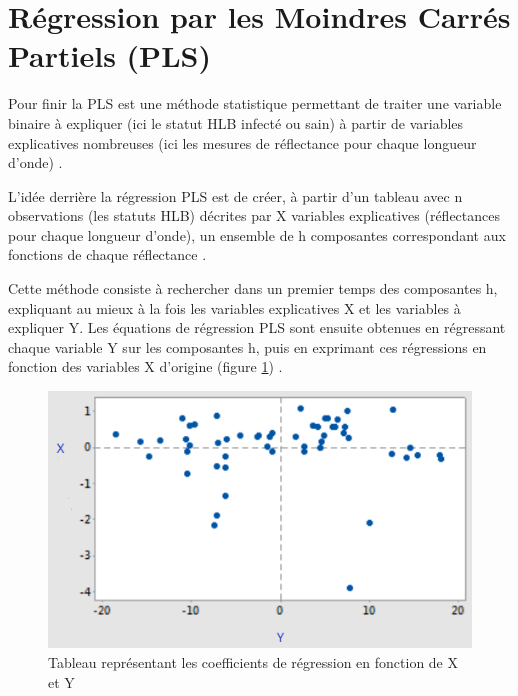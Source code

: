 \documentclass[
  11pt,
  french,
  a4paper,
  extrafontsizes,onecolumn,openright
  ]{memoir}
\begin{document}
\vfill
\newpage

\hypertarget{ruxe9gression-par-les-moindres-carruxe9s-partiels-pls}{%
\section{Régression par les Moindres Carrés Partiels (PLS)}\label{ruxe9gression-par-les-moindres-carruxe9s-partiels-pls}}

Pour finir la PLS est une méthode statistique permettant de traiter une variable binaire à expliquer (ici le statut HLB infecté ou sain) à partir de variables explicatives nombreuses (ici les mesures de réflectance pour chaque longueur d'onde) \autocite{pls}.

L'idée derrière la régression PLS est de créer, à partir d'un tableau avec n observations (les statuts HLB) décrites par X variables explicatives (réflectances pour chaque longueur d'onde), un ensemble de h composantes correspondant aux fonctions de chaque réflectance \autocite{tenehaus_lapproche_1999}.

Cette méthode consiste à rechercher dans un premier temps des composantes h, expliquant au mieux à la fois les variables explicatives X et les variables à expliquer Y. Les équations de régression PLS sont ensuite obtenues en régressant chaque variable Y sur les composantes h, puis en exprimant ces régressions en fonction des variables X d'origine (figure \ref{fig:15}) \autocite{tenehaus_lapproche_1999}.

\scriptsize

\begin{figure}

{\centering \includegraphics[width=0.8\linewidth]{Images/Figure15} 

}

\caption{Tableau représentant les coefficients de régression en fonction de X et Y}\label{fig:15}
\end{figure}
\end{document}

